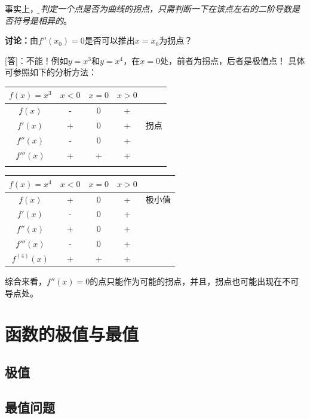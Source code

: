 事实上，{\it\b 要判定一个点是否为曲线的拐点，只需判断一下在该点左右的二阶导数是否符号是相异的}。

\begin{shaded}
	{\bf 讨论：}由$f''(x_0)=0$是否可以推出$x=x_0$为拐点？

	[答]：不能！例如$y=x^3$和$y=x^4$，在$x=0$处，前者为拐点，后者是极值点！
	具体可参照如下的分析方法：
	\begin{center}
	\begin{tabular}{c||c|c|c|c}
		\hline 
		$f(x)=x^3$ & $x<0$ & $x=0$ & $x>0$ & \\ 
		\hline 
		$f(x)$ & - & 0 & + & \\ 
		\hline 
		$f'(x)$ & + & 0 & + & 拐点\\ 
		\hline 
		$f''(x)$ & - & 0 & + & \\ 
		\hline 
		$f'''(x)$ & + & + & + & \\ 
		\hline 
		 &  &  &  &  \\ 
		\hline 
	\end{tabular} 
	\begin{tabular}{c||c|c|c|c}
		\hline 
		$f(x)=x^4$ & $x<0$ & $x=0$ & $x>0$ & \\ 
		\hline 
		$f(x)$ & + & 0 & + & 极小值\\ 
		\hline 
		$f'(x)$ & - & 0 & + & \\ 
		\hline 
		$f''(x)$ & + & 0 & + & \\ 
		\hline 
		$f'''(x)$ & - & 0 & + & \\ 
		\hline 
		$f^{(4)}(x)$ & + & + & + & \\ 
		\hline 
	\end{tabular} 
	\end{center}
	
	综合来看，$f''(x)=0$的点只能作为可能的拐点，并且，拐点也可能出现在不可导点处。
\end{shaded}

\section{函数的极值与最值}

\subsection{极值}

\subsection{最值问题}

